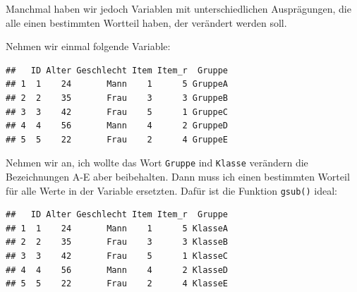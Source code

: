 \documentclass[
]{book}
\newenvironment{Shaded}{\begin{snugshade}}{\end{snugshade}}
\newcommand{\AttributeTok}[1]{\textcolor[rgb]{0.77,0.63,0.00}{#1}}
\newcommand{\FunctionTok}[1]{\textcolor[rgb]{0.00,0.00,0.00}{#1}}
\newcommand{\NormalTok}[1]{#1}
\newcommand{\OtherTok}[1]{\textcolor[rgb]{0.56,0.35,0.01}{#1}}
\newcommand{\SpecialCharTok}[1]{\textcolor[rgb]{0.00,0.00,0.00}{#1}}
\newcommand{\StringTok}[1]{\textcolor[rgb]{0.31,0.60,0.02}{#1}}
\begin{document}
Manchmal haben wir jedoch Variablen mit unterschiedlichen Ausprägungen, die alle einen bestimmten Wortteil haben, der verändert werden soll.

Nehmen wir einmal folgende Variable:

\begin{Shaded}
\end{Shaded}

\begin{verbatim}
##   ID Alter Geschlecht Item Item_r  Gruppe
## 1  1    24       Mann    1      5 GruppeA
## 2  2    35       Frau    3      3 GruppeB
## 3  3    42       Frau    5      1 GruppeC
## 4  4    56       Mann    4      2 GruppeD
## 5  5    22       Frau    2      4 GruppeE
\end{verbatim}

Nehmen wir an, ich wollte das Wort \texttt{Gruppe} ind \texttt{Klasse} verändern die Bezeichnungen A-E aber beibehalten. Dann muss ich einen bestimmten Worteil für alle Werte in der Variable ersetzten. Dafür ist die Funktion \texttt{gsub()} ideal:

\begin{Shaded}
\end{Shaded}

\begin{verbatim}
##   ID Alter Geschlecht Item Item_r  Gruppe
## 1  1    24       Mann    1      5 KlasseA
## 2  2    35       Frau    3      3 KlasseB
## 3  3    42       Frau    5      1 KlasseC
## 4  4    56       Mann    4      2 KlasseD
## 5  5    22       Frau    2      4 KlasseE
\end{verbatim}
\end{document}
